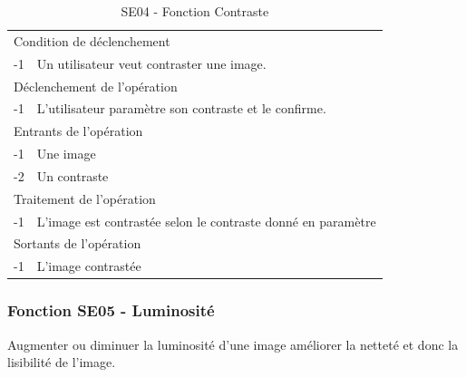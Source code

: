 \documentclass[a4paper]{article}
\begin{document}
\begin{table}[H]
  \centering
   \small
	\begin{tabular}{|c|p{12cm}|}
   		\hline
   			\rowcolor{lightgray}\multicolumn{2}{|c|}{\textbf{SE04 - Fonction Contraste}} \\
   		\hline
   			\multicolumn{2}{|l|}{Condition de d\'eclenchement} \\
   		\hline
   			-1 & Un utilisateur veut contraster une image. \\
   		\hline
   			\multicolumn{2}{|l|}{D\'eclenchement de l'op\'eration} \\
   		\hline
   			-1 & L'utilisateur paramètre son contraste et le confirme. \\
   		\hline
   			\multicolumn{2}{|l|}{Entrants de l'op\'eration} \\
   		\hline
        	-1 & Une image \\
   			-2 & Un contraste \\ 	
        \hline
   			\multicolumn{2}{|l|}{Traitement de l'op\'eration} \\
  		\hline
   			-1 & L'image est contrastée selon le contraste donné en paramètre \\
   		\hline
   			\multicolumn{2}{|l|}{Sortants de l'op\'eration} \\
   		\hline
   			-1 & L'image contrastée \\
   		\hline
	\end{tabular}
  \caption{SE04 - Fonction Contraste}
  \normalsize
  \label{tab:visu_img_contraste}
\end{table}



\subsubsection{Fonction SE05 - Luminosité}
Augmenter ou diminuer la luminosité d'une image améliorer la netteté et donc la lisibilité de l'image.
\end{document}

